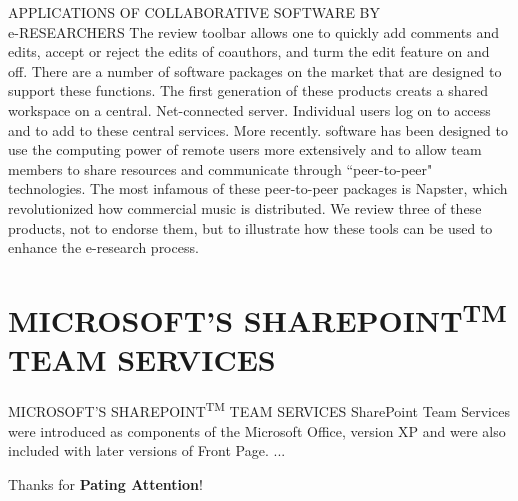 \documentclass{beamer}
\begin{document}

\begin{frame}[t]{APPLICATIONS OF COLLABORATIVE SOFTWARE BY\\ e-RESEARCHERS}
	The review toolbar allows one to quickly add comments
	and edits, accept or reject the edits of coauthors, and turm the edit feature on and off.
	There are a number of software packages on the market that are designed to support these functions. The first generation of these products creats a shared workspace
	on a central. Net-connected server. Individual users log on to access and to add to
	these central services. More recently. software has been designed to use the computing power of remote users more extensively and to allow team members to share
	resources and communicate through “peer-to-peer" technologies. The most infamous
	of these peer-to-peer packages is Napster, which revolutionized how commercial
	music is distributed. We review three of these products, not to endorse them, but to
	illustrate how these tools can be used to enhance the e-research process.
\end{frame}


\section{MICROSOFT'S SHAREPOINT\textsuperscript{TM} \\ TEAM SERVICES}


\begin{frame}[t]{MICROSOFT'S SHAREPOINT\textsuperscript{TM} TEAM SERVICES}
	SharePoint Team Services were introduced as components of the Microsoft Office,
	version XP and were also included with later versions of Front Page. ...
\end{frame}


\begin{frame}[focus]
	Thanks for \textbf{Pating Attention}!
\end{frame}

\end{document}
